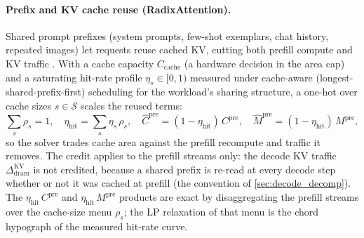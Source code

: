 \paragraph{Prefix and KV cache reuse (RadixAttention).}
Shared prompt prefixes (system prompts, few-shot exemplars, chat history,
repeated images) let requests reuse cached KV, cutting both prefill compute and
KV traffic \citep{zheng2024sglang,kwon2023vllm}. With a cache capacity
$C_{\mathrm{cache}}$ (a hardware decision in the area cap) and a saturating
hit-rate profile $\eta_s\in[0,1)$ measured under cache-aware
(longest-shared-prefix-first) scheduling for the workload's sharing structure, a
one-hot over cache sizes $s\in\mathcal{S}$ scales the reused terms:
\begin{equation}
\sum_s \rho_s = 1,\quad \eta_{\mathrm{hit}} = \sum_s \eta_s\,\rho_s,\quad
\widehat C^{\mathrm{pre}} = (1-\eta_{\mathrm{hit}})\,C^{\mathrm{pre}},\quad
\widehat M^{\mathrm{pre}} = (1-\eta_{\mathrm{hit}})\,M^{\mathrm{pre}},
\label{eq:v3_radix}
\end{equation}
so the solver trades cache area against the prefill recompute and traffic it
removes. The credit applies to the prefill streams only: the decode KV traffic
$\Delta^{\mathrm{KV}}_{\mathrm{dram}}$ is not credited, because a shared prefix
is re-read at every decode step whether or not it was cached at prefill (the
convention of \cref{sec:decode_decomp}). The $\eta_{\mathrm{hit}}\,C^{\mathrm{pre}}$
and $\eta_{\mathrm{hit}}\,M^{\mathrm{pre}}$ products are exact by disaggregating
the prefill streams over the cache-size menu $\rho_s$; the LP relaxation of that
menu is the chord hypograph of the measured hit-rate curve.

